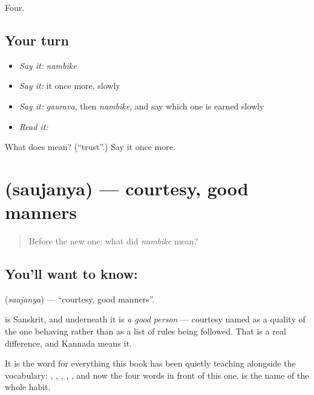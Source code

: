 \begin{grammarlens}[title={What you've built}]
Four.
\end{grammarlens}

\subsection*{Your turn}
\begin{itemize}
\raggedright
  \item \emph{Say it:} \emph{nambike}
  \item \emph{Say it:} it once more, slowly
  \item \emph{Say it:} \emph{gaurava}, then \emph{nambike}, and say which one is earned slowly
  \item \emph{Read it:} \textbf{}
\end{itemize}

\begin{tcolorbox}[breakable,colback=teal!4,colframe=teal!35!black,title={Before you move on}]
What does  mean? (\textquotedblleft{}trust\textquotedblright{}.) Say it once more.
\end{tcolorbox}
\section[\texorpdfstring{\kn{ಸೌಜನ್ಯ} (saujanya)}{ಸೌಜನ್ಯ (saujanya)}]{ (saujanya) — courtesy, good manners}

\label{lesson:KA-C65-manners}



\begin{quote}
Before the new one: what did \emph{nambike} mean?
\end{quote}

\subsection*{You'll want to know: }
\textbf{} (\emph{saujanya}) — \textquotedblleft{}courtesy, good manners\textquotedblright{}.

 is Sanskrit, and underneath it is \emph{a good person} — courtesy named as a quality of the one behaving rather than as a list of rules being followed. That is a real difference, and Kannada means it.

It is the word for everything this book has been quietly teaching alongside the vocabulary: , , , , , and now the four words in front of this one.  is the name of the whole habit.

